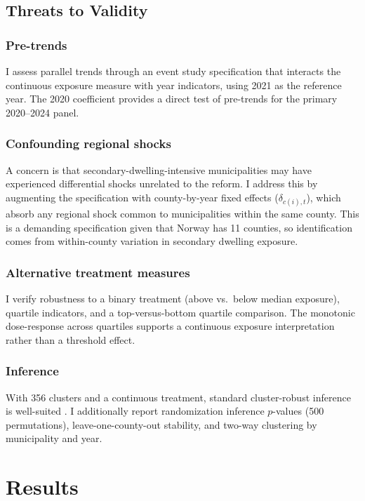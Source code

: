 \documentclass[12pt]{article}
\begin{document}
\subsection{Threats to Validity}

\subsubsection*{Pre-trends} I assess parallel trends through an event study specification that interacts the continuous exposure measure with year indicators, using 2021 as the reference year. The 2020 coefficient provides a direct test of pre-trends for the primary 2020--2024 panel.

\subsubsection*{Confounding regional shocks} A concern is that secondary-dwelling-intensive municipalities may have experienced differential shocks unrelated to the reform. I address this by augmenting the specification with county-by-year fixed effects ($\delta_{c(i),t}$), which absorb any regional shock common to municipalities within the same county. This is a demanding specification given that Norway has 11 counties, so identification comes from within-county variation in secondary dwelling exposure.

\subsubsection*{Alternative treatment measures} I verify robustness to a binary treatment (above vs.\ below median exposure), quartile indicators, and a top-versus-bottom quartile comparison. The monotonic dose-response across quartiles supports a continuous exposure interpretation rather than a threshold effect.

\subsubsection*{Inference} With 356 clusters and a continuous treatment, standard cluster-robust inference is well-suited \citep{notowidigdo2020incidence}. I additionally report randomization inference $p$-values (500 permutations), leave-one-county-out stability, and two-way clustering by municipality and year.

\section{Results}
\end{document}
